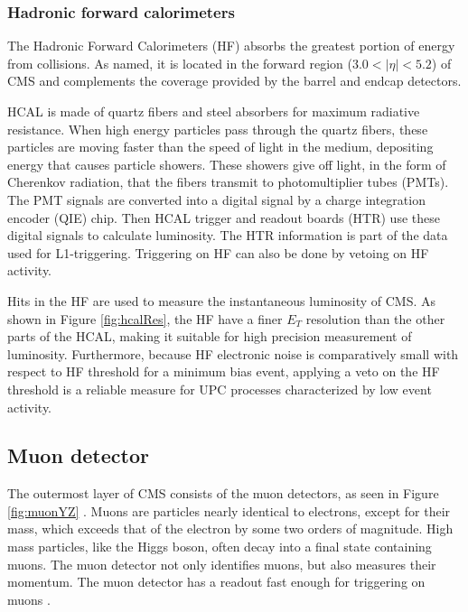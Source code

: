 \subsubsection{Hadronic forward calorimeters}

The Hadronic Forward Calorimeters (HF) absorbs the greatest portion of energy from collisions. As named, it is located in the forward region ($3.0<|\eta| < 5.2 $) of CMS and complements the coverage provided by the barrel and endcap detectors.

HCAL is made of quartz fibers and steel absorbers for maximum radiative resistance. When high energy particles pass through the quartz fibers, these particles are moving faster than the speed of light in the medium, depositing energy that causes particle showers. These showers give off light, in the form of Cherenkov radiation, that the fibers transmit to photomultiplier tubes (PMTs). The PMT signals are converted into a digital signal by a charge integration encoder (QIE) chip. Then HCAL trigger and readout boards (HTR) use these digital signals to calculate luminosity. The HTR information is part of the data used for L1-triggering. Triggering on HF can also be done by vetoing on HF activity. 

Hits in the HF are used to measure the instantaneous luminosity of CMS. As shown in Figure \ref{fig:hcalRes}, the HF have a finer $E_T$ resolution than the other parts of the HCAL, making it suitable for high precision measurement of luminosity. Furthermore, because HF electronic noise is comparatively small with respect to HF threshold for a minimum bias event, applying a veto on the HF threshold is a reliable measure for UPC processes characterized by low event activity. 

\subsection{Muon detector}

The outermost layer of CMS consists of the muon detectors, as seen in Figure \ref{fig:muonYZ} \cite{Bayatian:2006nff}. Muons are particles nearly identical to electrons, except for their mass, which exceeds that of the electron by some two orders of magnitude. High mass particles, like the Higgs boson, often decay into a final state containing muons. The muon detector not only identifies muons, but also measures their momentum. The muon detector has a readout fast enough for triggering on muons \cite{CMS_AN_2008-098} \cite{cmsTnP}.

